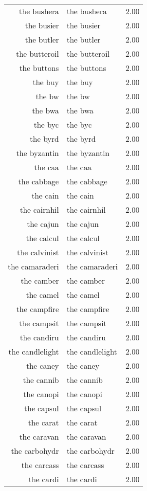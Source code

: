 \begin{table}[ht]
\begin{tabular}{rlr}
  the bushera & the bushera & 2.00 \\ 
  the busier & the busier & 2.00 \\ 
  the butler & the butler & 2.00 \\ 
  the butteroil & the butteroil & 2.00 \\ 
  the buttons & the buttons & 2.00 \\ 
  the buy & the buy & 2.00 \\ 
  the bw & the bw & 2.00 \\ 
  the bwa & the bwa & 2.00 \\ 
  the byc & the byc & 2.00 \\ 
  the byrd & the byrd & 2.00 \\ 
  the byzantin & the byzantin & 2.00 \\ 
  the caa & the caa & 2.00 \\ 
  the cabbage & the cabbage & 2.00 \\ 
  the cain & the cain & 2.00 \\ 
  the cairnhil & the cairnhil & 2.00 \\ 
  the cajun & the cajun & 2.00 \\ 
  the calcul & the calcul & 2.00 \\ 
  the calvinist & the calvinist & 2.00 \\ 
  the camaraderi & the camaraderi & 2.00 \\ 
  the camber & the camber & 2.00 \\ 
  the camel & the camel & 2.00 \\ 
  the campfire & the campfire & 2.00 \\ 
  the campsit & the campsit & 2.00 \\ 
  the candiru & the candiru & 2.00 \\ 
  the candlelight & the candlelight & 2.00 \\ 
  the caney & the caney & 2.00 \\ 
  the cannib & the cannib & 2.00 \\ 
  the canopi & the canopi & 2.00 \\ 
  the capsul & the capsul & 2.00 \\ 
  the carat & the carat & 2.00 \\ 
  the caravan & the caravan & 2.00 \\ 
  the carbohydr & the carbohydr & 2.00 \\ 
  the carcass & the carcass & 2.00 \\ 
  the cardi & the cardi & 2.00 \\ 

\end{tabular}
\end{table}
